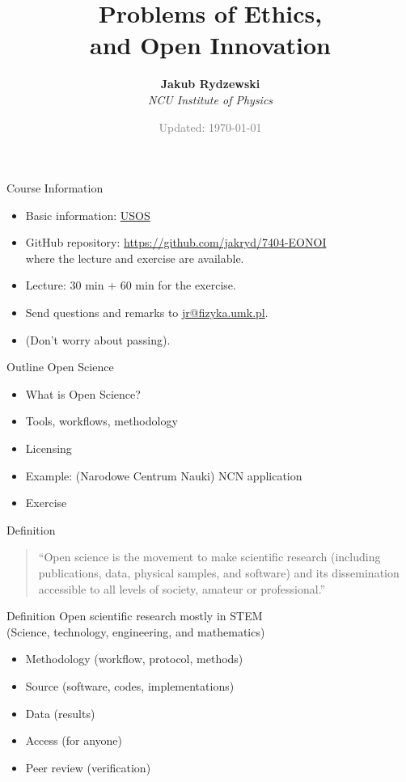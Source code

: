 \documentclass[10pt]{beamer}
\title{Problems of Ethics, {\color{red}{Open Science}} \\ and Open Innovation}
\author{\textbf{Jakub Rydzewski}\\[5pt]
  \footnotesize{\it NCU Institute of Physics}}
\date{\footnotesize\textcolor{gray}{Updated: \today}}
\begin{document}
{\frame{\titlepage}}

\begin{frame}{Course Information}
\begin{itemize}
\setlength\itemsep{1em}
  \item Basic information: \href{https://usosweb.umk.pl/kontroler.php?_action=katalog2\%2Fprzedmioty\%2FpokazPrzedmiot&kod=7404-EONOI&lang=en}{USOS}
  \item GitHub repository: \url{https://github.com/jakryd/7404-EONOI} \\ 
    where the lecture and exercise are available.
  \item Lecture: 30 min + 60 min for the exercise.
  \item Send questions and remarks to \url{jr@fizyka.umk.pl}.
  \item (Don't worry about passing).
\end{itemize}
\end{frame}

\begin{frame}{Outline}
\textcolor{subtitle}{Open Science}
\begin{itemize}
  \item What is Open Science?
  \item Tools, workflows, methodology
  \item Licensing
  \item Example: (Narodowe Centrum Nauki) NCN application
  \item Exercise
\end{itemize}
\end{frame}

\begin{frame}{Definition}
\begin{quote}
  ``Open science is the movement to make scientific research (including publications, data, physical samples, and software) and its dissemination accessible to all levels of society, amateur or professional.''
\end{quote}
\end{frame}

\begin{frame}{Definition}
  \textcolor{subtitle}{Open scientific research mostly in STEM \\ (Science, technology, engineering, and mathematics)}
\begin{itemize}
  \item Methodology (workflow, protocol, methods)
  \item Source (software, codes, implementations)
  \item Data (results)
  \item Access (for anyone)
  \item Peer review (verification)
\end{itemize}
\end{frame}
\end{document}
